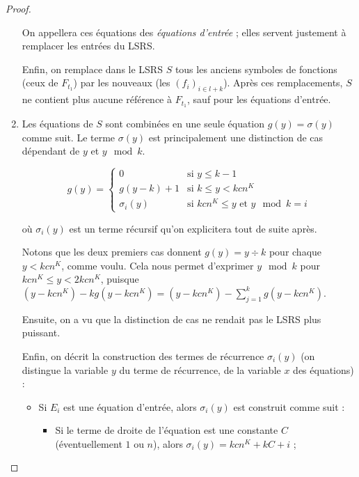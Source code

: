 \begin{proof}
\begin{enumerate}[itemsep=-1mm,leftmargin=2cm]
					On appellera ces équations des \emph{équations d'entrée} ; elles servent justement à remplacer les entrées du LSRS.
					
					Enfin, on remplace dans le LSRS $S$ tous les anciens symboles de fonctions (ceux de $F_{t_1}$) par les nouveaux (les $(f_i)_{i \in l+k}$). Après ces remplacements, $S$ ne contient plus aucune référence à $F_{t_1}$, sauf pour les équations d'entrée. 
					
				\item 	
					Les équations de $S$ sont combinées en une seule équation $g(y) = \sigma(y)$ comme suit. Le terme $\sigma(y)$ est principalement une distinction de cas dépendant de $y$ et $y \mod{k}$. 
				
					\[
						g(y) = 
							\left\lbrace \begin{array}{ll}
								0 				& \text{si $y \leqslant k-1$} \\
								g(y-k) + 1 		& \text{si $k \leqslant y < kcn^K$} \\
								\sigma_i(y)		& \text{si $kcn^K \leqslant y$ et $y \mod{k} = i$}
							\end{array}\right.
					\]
					
					où $\sigma_i(y)$ est un terme récursif qu'on explicitera tout de suite après. 
					
					Notons que les deux premiers cas donnent $g(y) = y \div k$ pour chaque $y < kcn^K$, comme voulu. Cela nous permet d'exprimer $y \mod{k}$ pour $kcn^K \leqslant y < 2kcn^K$, puisque $(y-kcn^K) - kg(y-kcn^K) = (y-kcn^K) - \sum_{j=1}^{k} g(y-kcn^K)$. 
					
					Ensuite, on a vu que la distinction de cas ne rendait pas le LSRS plus puissant. 
					
					Enfin, on décrit la construction des termes de récurrence $\sigma_i(y)$ (on distingue la variable $y$ du terme de récurrence, de la variable $x$ des équations) :
					
					\begin{itemize}[itemsep=-1mm, leftmargin=1cm]
						\item
							Si $E_i$ est une équation d'entrée, alors $\sigma_i(y)$ est construit comme suit :
					
							\begin{itemize}[itemsep=-1mm,leftmargin=1cm]
								\item %
								Si le terme de droite de l'équation est une constante $C$ (éventuellement $1$ ou $n$), alors $\sigma_i(y) = kcn^K + kC + i$ ;
								

\end{itemize}
\end{itemize}
\end{enumerate}
\end{proof}
